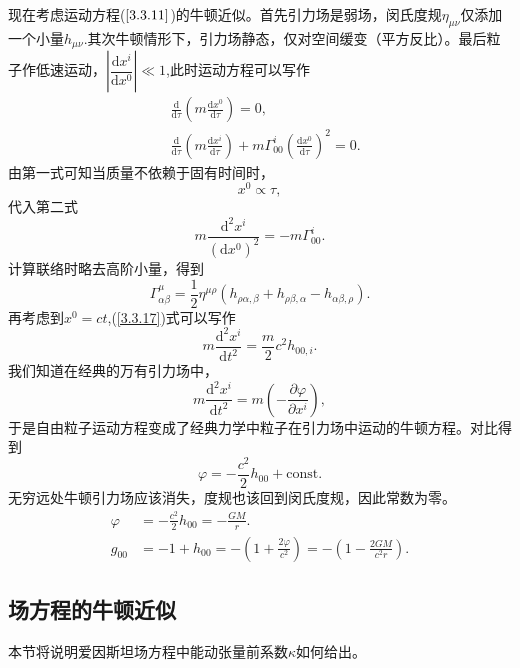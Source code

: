 \documentclass[11pt, a4paper, oneside, onecolumn]{ctexart}
\numberwithin{equation}{subsection}
\begin{document}
现在考虑运动方程($\ref{3.3.11}$)的牛顿近似。首先引力场是弱场，闵氏度规$\eta_{\mu\nu}$仅添加一个小量$h_{\mu\nu}$.其次牛顿情形下，引力场静态，仅对空间缓变（平方反比）。最后粒子作低速运动，$\left\vert{}\dfrac{\mathrm{d}x^{i}}{\mathrm{d}x^{0}}\right\vert{}\ll1$,此时运动方程可以写作
\begin{align}
&\frac{\mathrm{d}}{\mathrm{d}\tau}\left(m\frac{\mathrm{d}x^{0}}{\mathrm{d}\tau}\right)=0,\\
&\frac{\mathrm{d}}{\mathrm{d}\tau}\left(m\frac{\mathrm{d}x^{i}}{\mathrm{d}\tau}\right)+m\Gamma_{00}^{i}\left(\frac{\mathrm{d}x^{0}}{\mathrm{d}\tau}\right)^{2}=0.
\end{align}
由第一式可知当质量不依赖于固有时间时，
\begin{equation}
x^{0}\propto{}\tau,
\end{equation}
代入第二式
\begin{equation}
m\frac{\mathrm{d}^{2}x^{i}}{\left(\mathrm{d}x^{0}\right)^{2}}=-m\Gamma_{00}^{i}.\label{3.3.17}
\end{equation}
计算联络时略去高阶小量，得到
\begin{equation}
\Gamma_{\alpha\beta}^{\mu}=\frac{1}{2}\eta^{\mu\rho}\left(h_{\rho\alpha,\beta}+h_{\rho\beta,\alpha}-h_{\alpha\beta,\rho}\right).
\end{equation}
再考虑到$x^{0}=ct$,(\ref{3.3.17})式可以写作
\begin{equation}
m\frac{\mathrm{d}^{2}x^{i}}{\mathrm{d}t^{2}}=\frac{m}{2}c^{2}h_{00,i}.
\end{equation}
我们知道在经典的万有引力场中，
\begin{equation}
m\frac{\mathrm{d}^{2}x^{i}}{\mathrm{d}t^{2}}=m\left(-\frac{\partial{}\varphi}{\partial{}x^{i}}\right),
\end{equation}
于是自由粒子运动方程变成了经典力学中粒子在引力场中运动的牛顿方程。对比得到
\begin{equation}
\varphi=-\frac{c^{2}}{2}h_{00}+\text{const}.
\end{equation}
无穷远处牛顿引力场应该消失，度规也该回到闵氏度规，因此常数为零。
\begin{align}
\varphi&=-\frac{c^{2}}{2}h_{00}=-\frac{GM}{r}.\\
g_{00}&=-1+h_{00}=-\left(1+\frac{2\varphi}{c^{2}}\right)=-\left(1-\frac{2GM}{c^{2}r}\right).
\end{align}

\subsection{场方程的牛顿近似}
本节将说明爱因斯坦场方程中能动张量前系数$\kappa$如何给出。
\end{document}
